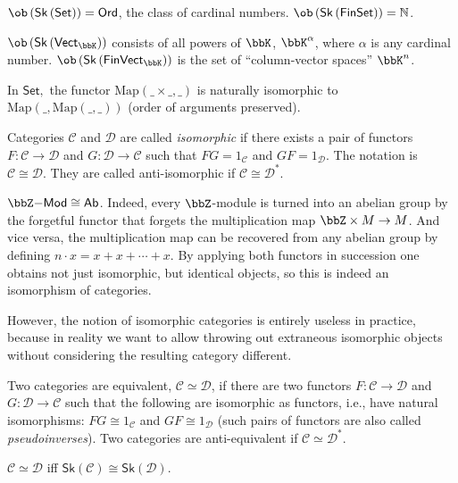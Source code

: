 \begin{example}
    $\ob\left(\mathsf{Sk}\left(\mathsf{Set}\right)\right)=\mathsf{Ord}$,
    the class of cardinal numbers. $\ob\left(\mathsf{Sk}\left(\mathsf{FinSet}\right)\right)=\mathbb{N}$. 
\end{example}
%
\begin{example}
    $\ob\left(\mathsf{Sk}\left(\mathsf{Vect}_{\bbK}\right)\right)$ consists
    of all powers of $\bbK$, $\bbK^{\alpha}$, where $\alpha$ is any cardinal
    number. $\ob\left(\mathsf{Sk}\left(\mathsf{FinVect}_{\bbK}\right)\right)$
    is the set of ``column-vector spaces'' $\bbK^{n}$.
    \end{example}
    \begin{example}
    In $\mathsf{Set},$ the functor $\mathrm{Map}\left(\_\times\_,\_\right)$
    is naturally isomorphic to $\mathrm{Map}\left(\_,\mathrm{Map}\left(\_,\_\right)\right)$
    (order of arguments preserved).
\end{example}
\begin{defn}
    Categories $\mathcal{C}$ and $\mathcal{D}$ are called \emph{isomorphic}
    if there exists a pair of functors $F:\mathcal{C}\to\mathcal{D}$
    and $G:\mathcal{D}\to\mathcal{C}$ such that $FG=1_{\mathcal{C}}$
    and $GF=1_{\mathcal{D}}$. The notation is $\mathcal{C}\cong\mathcal{D}$.
    They are called anti-isomorphic if $\mathcal{C}\cong\mathcal{D}^{\ast}$.
\end{defn}

\begin{example}
    $\bbZ\mathsf{-Mod}\cong \mathsf{Ab}$. Indeed, every $\bbZ$-module is turned into an abelian group by the forgetful functor that forgets the multiplication map $\bbZ\times M\to M$. And vice versa, the multiplication map can be recovered from any abelian group by defining $n\cdot x=x+x+\cdots +x$. By applying both functors in succession one obtains not just isomorphic, but identical objects, so this is indeed an isomorphism of categories.
\end{example}

However, the notion of isomorphic categories is entirely useless in
practice, because in reality we want to allow throwing out extraneous
isomorphic objects without considering the resulting category different.
\begin{defn}
 Two categories are equivalent, $\mathcal{C}\simeq\mathcal{D}$,
if there are two functors $F:\mathcal{C}\to\mathcal{D}$ and $G:\mathcal{D}\to\mathcal{C}$
such that the following are isomorphic as functors, i.e., have natural
isomorphisms: $FG\cong1_{\mathcal{C}}$ and $GF\cong1_{\mathcal{D}}$ (such pairs of functors are also called \emph{pseudoinverses}). 
Two categories are anti-equivalent if $\mathcal{C}\simeq\mathcal{D}^{\ast}$.
\end{defn}
%
\begin{prop}
    $\mathcal{C}\simeq\mathcal{D}$ iff $\mathsf{Sk}\left(\mathcal{C}\right)\cong\mathsf{Sk}\left(\mathcal{D}\right)$.
\end{prop}


